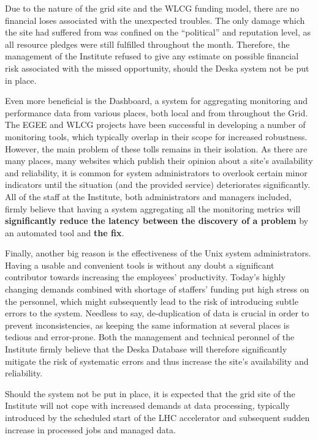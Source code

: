 \documentclass[12pt]{article}
\begin{document}
Due to the nature of the grid site and the WLCG funding model, there are no financial loses associated with the unexpected
troubles.  The only damage which the site had suffered from was confined on the ``political'' and reputation level, as all
resource pledges were still fulfilled throughout the month.  Therefore, the management of the Institute refused to give any
estimate on possible financial risk associated with the missed opportunity, should the Deska system not be put in place.

Even more beneficial is the Dashboard, a system for aggregating monitoring and performance data from various places, both local
and from throughout the Grid.  The EGEE and WLCG projects have been successful in developing a number of monitoring tools, which
typically overlap in their scope for increased robustness.  However, the main problem of these tolls remains in their isolation.
As there are many places, many websites which publish their opinion about a site's availability and reliability, it is common for
system administrators to overlook certain minor indicators until the situation (and the provided service) deteriorates
significantly.  All of the staff at the Institute, both administrators and managers included, firmly believe that having a system
aggregating all the monitoring metrics will {\bf significantly reduce the latency between the discovery of a problem} by an
automated tool and {\bf the fix}.

Finally, another big reason is the effectiveness of the Unix system administrators.  Having a usable and convenient tools is
without any doubt a significant contributor towards increasing the employees' productivity.  Today's highly changing demands
combined with shortage of staffers' funding put high stress on the personnel, which might subsequently lead to the risk of
introducing subtle errors to the system.  Needless to say, de-duplication of data is crucial in order to prevent inconsistencies,
as keeping the same information at several places is tedious and error-prone.  Both the management and technical peronnel of the
Institute firmly believe that the Deska Database will therefore significantly mitigate the risk of systematic errors and thus
increase the site's availability and reliability.

Should the system not be put in place, it is expected that the grid site of the Institute will not cope with increased demands at
data processing, typically introduced by the scheduled start of the LHC accelerator and subsequent sudden increase in processed
jobs and managed data.
\end{document}
